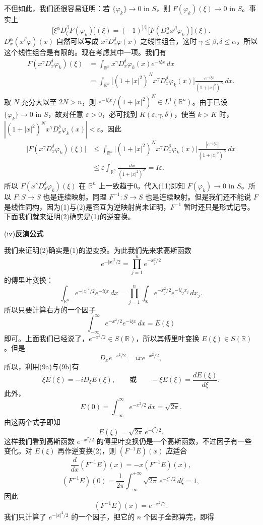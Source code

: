 不但如此，我们还很容易证明：若 $\{\varphi_k\}\to0$ in $S$，则 $F(\varphi_k)(\xi)\to0$ in $S$。事实上
\begin{equation}
 \bigl[\xi^\alpha D_\xi^\beta F(\varphi_k)\bigr](\xi)
 =(-1)^{|\beta|}\bigl[F(D_x^\alpha x^\beta\varphi_k)\bigr](\xi).
 \tag{11}
\end{equation}
$D_x^\alpha(x^\beta\varphi)(x)$ 自然可以写成 $x^\gamma D_x^\delta\varphi(x)$ 之线性组合，这时 $\gamma\le\beta,\delta\le\alpha$，所以这个线性组合是有限的。现在考虑其中一项。我们有
\[
 \begin{aligned}
 F(x^\gamma D_x^\delta\varphi_k)(\xi)
 &=\int_{\mathbb R^n}x^\gamma D_x^\delta\varphi_k(x)e^{-i\xi x}\,dx\\
 &=\int_{\mathbb R^n}\bigl[(1+|x|^2)^Nx^\gamma D_x^\delta\varphi_k(x)\bigr]
 \frac{e^{-i\xi x}}{(1+|x|^2)^N}\,dx.
 \end{aligned}
\]
取 $N$ 充分大以至 $2N>n$，则 $e^{-i\xi x}/(1+|x|^2)^N\in L^1(\mathbb R^n)$。由于已设 $\{\varphi_k\}\to0$ in $S$，故对任意 $\varepsilon>0$，必可找到 $K(\varepsilon,\gamma,\delta)$，使当 $k>K$ 时，$|(1+|x|^2)^Nx^\gamma D_x^\delta\varphi_k(x)|<\varepsilon$。因此
\[
 \begin{aligned}
 \bigl|F(x^\gamma D_x^\delta\varphi_k)(\xi)\bigr|
 &\le\int_{\mathbb R^n}\bigl|(1+|x|^2)^Nx^\gamma D_x^\delta\varphi_k(x)\bigr|
 \frac{|e^{-i\xi x}|}{(1+|x|^2)^N}\,dx\\
 &\le\varepsilon\int_{\mathbb R^n}\frac{dx}{(1+|x|^2)^N}=I\varepsilon.
 \end{aligned}
\]
所以 $F(x^\gamma D_x^\delta\varphi_k)(\xi)$ 在 $\mathbb R^n$ 上一致趋于0。代入(11)即知 $F(\varphi_k)\to0$ in $S$。所以 $F:S\to S$ 也是连续映射。同理 $F^{-1}:S\to S$ 也是连续映射。但是我们还不能说 $F$ 是线性同构，因为(1)与(2)是否互为逆映射尚未证明，$F^{-1}$ 暂时还只是形式记号。下面我们就来证明(2)确实是(1)的逆变换。

\noindent(iv)\textbf{反演公式}

我们来证明(2)确实是(1)的逆变换。为此我们先来求高斯函数
\[
 e^{-|x|^2/2}=\prod_{j=1}^n e^{-x_j^2/2}
\]
的傅里叶变换：
\[
 \int_{\mathbb R^n}e^{-|x|^2/2}e^{-i\xi x}\,dx
 =\prod_{j=1}^n\int_{\mathbb R}e^{-x_j^2/2}e^{-i\xi_jx_j}\,dx_j.
\]
所以只要计算右方的一个因子
\[
 \int_{-\infty}^{\infty}e^{-x^2/2}e^{-i\xi x}\,dx=E(\xi)
\]
即可。上面我们已经说了，$e^{-x^2/2}\in S(\mathbb R)$，所以其傅里叶变换 $E(\xi)\in S(\mathbb R)$。但是
\[
 D_xe^{-x^2/2}=ixe^{-x^2/2},
\]
所以，利用(9a)与(9b)有
\[
 \xi E(\xi)=-iD_\xi E(\xi),\qquad\text{或}\qquad -\xi E(\xi)=\frac{dE(\xi)}{d\xi}.
\]
此外，
\[
 E(0)=\int_{-\infty}^{\infty}e^{-x^2/2}\,dx=\sqrt{2\pi}.
\]
由这两个式子即知
\[
 E(\xi)=\sqrt{2\pi}\,e^{-\xi^2/2}.
\]
这样我们看到高斯函数 $e^{-x^2/2}$ 的傅里叶变换仍是一个高斯函数，不过因子有一些变化。对 $E(\xi)$ 再作逆变换(2)，则 $(F^{-1}E)(x)$ 应适合
\[
 \frac d{dx}(F^{-1}E)(x)=-x(F^{-1}E)(x),
\]
\[
 (F^{-1}E)(0)=\frac1{2\pi}\int_{-\infty}^{+\infty}\sqrt{2\pi}\,e^{-\xi^2/2}\,d\xi=1,
\]
因此
\[
 (F^{-1}E)(x)=e^{-x^2/2}.
\]
我们只计算了 $e^{-|x|^2/2}$ 的一个因子，把它的 $n$ 个因子全部算完，即得

